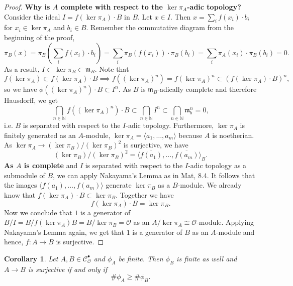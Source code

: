 \documentclass{article}
\theoremstyle{plain}%
\newtheorem{corollary}{Corollary}[section]
\theoremstyle{definition}
\theoremstyle{remark}
\newcommand{\cob}{\mathcal{C}_\mathcal{O}^\bullet}
\begin{document}
\begin{proof}
    \textbf{Why is \(A\) complete with respect to the \(\ker \pi_A\)-adic topology?}
    Consider the ideal \(I = f(\ker \pi_A) \cdot B\) in \(B\).
    Let \(x \in I\). Then \(x = \sum_i f(x_i) \cdot b_i\) for \(x_i \in \ker \pi_A\) and \(b_i \in B\).
    Remember the commutative diagram from the beginning of the proof,
    \[
        \pi_B(x) = \pi_B\left(\sum_i f(x_i)\cdot b_i\right) 
        = \sum_i \pi_B(f(x_i))\cdot \pi_B(b_i) 
        = \sum_i\pi_A(x_i)\cdot \pi_B(b_i) = 0. 
    \]
    As a result, \(I \subset \ker \pi_B \subset \mathfrak{m}_B\).
    Note that
    \[
        f(\ker \pi_A) \subset f(\ker \pi_A)\cdot B \implies f((\ker \pi_A)^n) 
        = f(\ker \pi_A)^n \subset (f(\ker \pi_A)\cdot B)^n,
    \]
    so we have \(\phi((\ker \pi_A)^n)\cdot B \subset I^n\).
    As \(B\) is \(\mathfrak{m}_B\)-adically complete and therefore Hausdorff, we get
    \[
        \bigcap_{n \in \mathbb N} f((\ker \pi_A)^n) \cdot B \subset \bigcap_{n \in \mathbb N} I^n 
        \subset \bigcap_{n \in \mathbb N} \mathfrak{m}_b^n = 0,
    \]
    i.e. \(\!B\) is separated with respect to the \(I\)-adic topology.
    Furthermore, \(\ker \pi_A\) is finitely generated as an \(A\)-module, 
    \(\ker \pi_A = \langle a_1, \dots, a_m\rangle\) because \(A\) is noetherian. 
    As \(\ker \pi_A \to (\ker \pi_B)/(\ker \pi_B)^2\) is surjective, we have 
    \[(\ker \pi_B)/(\ker \pi_B)^2 = \langle \overline{f(a_1)}, \dots, \overline{f(a_m)}\rangle_B.\]
    \textbf{As \(A\) is complete} and \(I\) is separated with respect to the \(I\)-adic topology 
    as a submodule of \(B\), we can apply Nakayama's Lemma as in Mat, 8.4. 
    It follows that the images \(\langle f(a_1), \dots, f(a_m)\rangle\) generate \(\ker \pi_B\)
    as a \(B\)-module. We already know that \(f(\ker \pi_A) \cdot B \subset \ker \pi_B\). 
    Together we have
    \[
        f(\ker \pi_A) \cdot B = \ker \pi_B.
    \]
    Now we conclude that \(1\) is a generator of \(B/I = B/f(\ker \pi_A) B = B/\ker \pi_B = \mathcal{O}\) as an 
    \(A/\ker \pi_A \cong \mathcal{O}\)-module.
    Applying Nakayama's Lemma again, we get that \(1\) is a generator of \(B\) as an \(A\)-module 
    and hence, \(f\colon A \to B\) is surjective.
\end{proof}

\begin{corollary}\label{cor:surjectivity_phi}
    Let \(A, B\in \cob\) and \(\phi_A\) be finite. Then \(\phi_B\) is finite as well
    and \(A \to B\) is surjective if and only if \[\# \phi_A \geq \# \phi_B.\]
\end{corollary}
\end{document}
